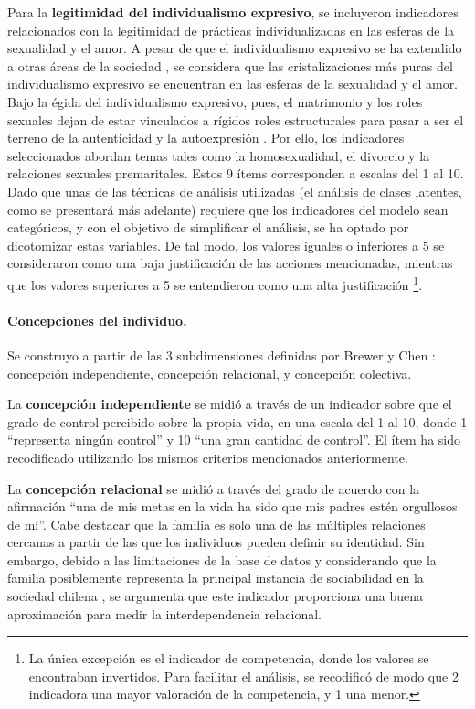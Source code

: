 \documentclass[12pt,twoside]{templates/facsothesis}
\begin{document}
Para la \textbf{legitimidad del individualismo expresivo}, se incluyeron indicadores relacionados con la legitimidad de prácticas individualizadas en las esferas de la sexualidad y el amor. A pesar de que el individualismo expresivo se ha extendido a otras áreas de la sociedad \citep{gauthier2021}, se considera que las cristalizaciones más puras del individualismo expresivo se encuentran en las esferas de la sexualidad y el amor. Bajo la égida del individualismo expresivo, pues, el matrimonio y los roles sexuales dejan de estar vinculados a rígidos roles estructurales para pasar a ser el terreno de la autenticidad y la autoexpresión \citep{illouz2020}. Por ello, los indicadores seleccionados abordan temas tales como la homosexualidad, el divorcio y la relaciones sexuales premaritales.
Estos 9 ítems corresponden a escalas del 1 al 10. Dado que unas de las técnicas de análisis utilizadas (el análisis de clases latentes, como se presentará más adelante) requiere que los indicadores del modelo sean categóricos, y con el objetivo de simplificar el análisis, se ha optado por dicotomizar estas variables. De tal modo, los valores iguales o inferiores a 5 se consideraron como una baja justificación de las acciones mencionadas, mientras que los valores superiores a 5 se entendieron como una alta justificación \footnote{La única excepción es el indicador de competencia, donde los valores se encontraban invertidos. Para facilitar el análisis, se recodificó de modo que 2 indicadora una mayor valoración de la competencia, y 1 una menor.}.

\hypertarget{concepciones-del-individuo.}{%
\paragraph*{Concepciones del individuo.}\label{concepciones-del-individuo.}}

Se construyo a partir de las 3 subdimensiones definidas por Brewer y Chen \citeyearpar{brewer2007}: concepción independiente, concepción relacional, y concepción colectiva.

La \textbf{concepción independiente} se midió a través de un indicador sobre que el grado de control percibido sobre la propia vida, en una escala del 1 al 10, donde 1 ``representa ningún control'' y 10 ``una gran cantidad de control''. El ítem ha sido recodificado utilizando los mismos criterios mencionados anteriormente.

La \textbf{concepción relacional} se midió a través del grado de acuerdo con la afirmación ``una de mis metas en la vida ha sido que mis padres estén orgullosos de mí''. Cabe destacar que la familia es solo una de las múltiples relaciones cercanas a partir de las que los individuos pueden definir su identidad. Sin embargo, debido a las limitaciones de la base de datos y considerando que la familia posiblemente representa la principal instancia de sociabilidad en la sociedad chilena \citep{araujo2012}, se argumenta que este indicador proporciona una buena aproximación para medir la interdependencia relacional.
\end{document}
